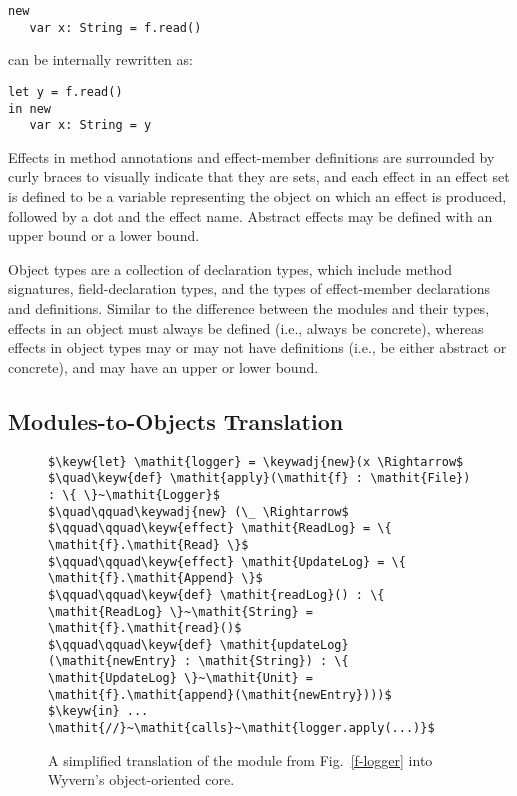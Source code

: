 \begin{minipage}{\linewidth}
\begin{lstlisting}[xleftmargin=-5pt, numbers=none]
new
   var x: String = f.read()
\end{lstlisting}
\end{minipage}
can be internally rewritten as:

\begin{minipage}{\linewidth}
\begin{lstlisting}[xleftmargin=-5pt, numbers=none]
let y = f.read()
in new
   var x: String = y
\end{lstlisting}
\end{minipage}
Effects in method annotations and effect-member definitions are surrounded by curly braces to visually indicate that they are sets, and each effect in an effect set is defined to be a variable representing the object on which an effect is produced, followed by a dot and the effect name. Abstract effects may be defined with an upper bound or a lower bound.



Object types are a collection of declaration types, which include method signatures, field-declaration types, and the types of effect-member declarations and definitions. Similar to the difference between the modules and their types, effects in an object must always be defined (i.e., always be concrete), whereas effects in object types may or may not have definitions (i.e., be either abstract or concrete), and may have an upper or lower bound.


\subsection{Modules-to-Objects Translation}

\begin{figure}[htb]
\begin{lstlisting}
$\keyw{let} \mathit{logger} = \keywadj{new}(x \Rightarrow$
$\quad\keyw{def} \mathit{apply}(\mathit{f} : \mathit{File}) : \{ \}~\mathit{Logger}$
$\quad\qquad\keywadj{new} (\_ \Rightarrow$
$\qquad\qquad\keyw{effect} \mathit{ReadLog} = \{ \mathit{f}.\mathit{Read} \}$
$\qquad\qquad\keyw{effect} \mathit{UpdateLog} = \{ \mathit{f}.\mathit{Append} \}$
$\qquad\qquad\keyw{def} \mathit{readLog}() : \{ \mathit{ReadLog} \}~\mathit{String} = \mathit{f}.\mathit{read}()$
$\qquad\qquad\keyw{def} \mathit{updateLog}(\mathit{newEntry} : \mathit{String}) : \{ \mathit{UpdateLog} \}~\mathit{Unit} = \mathit{f}.\mathit{append}(\mathit{newEntry})))$
$\keyw{in} ... \mathit{//}~\mathit{calls}~\mathit{logger.apply(...)}$
\end{lstlisting}
\caption{A simplified translation of the  module from Fig.~\ref{f-logger} into Wyvern's object-oriented core.}
\label{f-module-translation}
\end{figure}

